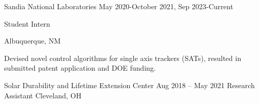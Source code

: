\documentclass[10pt]{article}
\begin{document}
{    
\vspace{0.25cm}

	\job
{Sandia National Laboratories}
{May 2020-October 2021, Sep 2023-Current}
{
	
	Student Intern
}
{Albuquerque, NM}
\


{\begin{newitemize}
		\item Devised novel control algorithms for single axis trackers (SATs), resulted in submitted patent application and DOE funding.
\end{newitemize}}


\vspace{0.25cm}
	\job
	{Solar Durability and Lifetime Extension Center}
	{Aug 2018 – May 2021}
	{Research Assistant}
	{Cleveland, OH}
	\
	
	{\begin{newitemize}


\end{newitemize}}}
\end{document}
